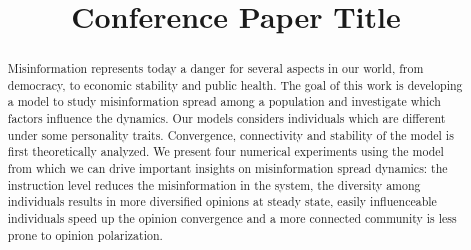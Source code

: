 \documentclass[11pt,conference]{IEEEtran}
\begin{document}
\title{Conference Paper Title\\}

\author{
\and
{}
\and
{}
}

\maketitle

\begin{abstract}
Misinformation represents today a danger for several aspects in our world, from democracy, to economic stability and public health. The goal of this work is developing a model to study misinformation spread among a population and investigate which factors influence the dynamics. Our models considers individuals which are different under some personality traits. Convergence, connectivity and stability of the model is first theoretically analyzed. We present four numerical experiments using the model from which we can drive important insights on misinformation spread dynamics: the instruction level reduces the misinformation in the system, the diversity among individuals results in more diversified opinions at steady state, easily influenceable individuals speed up the opinion convergence and a more connected community is less prone to opinion polarization.
\end{abstract}









\cleardoublepage
\appendix



\end{document}

